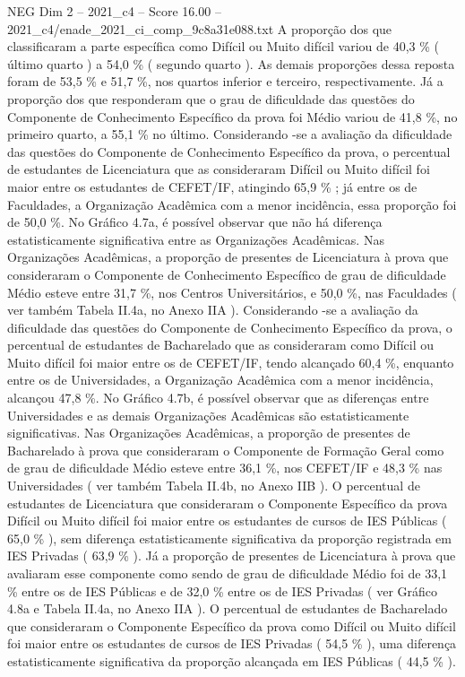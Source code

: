 \begin{textsample}{NEG Dim 2 – 2021\_c4 – Score 16.00 – 2021\_c4/enade\_2021\_ci\_comp\_9c8a31e088.txt}
A proporção dos que classificaram a parte específica como Difícil ou Muito difícil variou de 40,3 \% ( último quarto ) a 54,0 \% ( segundo quarto ).
As demais proporções dessa reposta foram de 53,5 \% e 51,7 \%, nos quartos inferior e terceiro, respectivamente.
Já a proporção dos que responderam que o grau de dificuldade das questões do Componente de Conhecimento Específico da prova foi Médio variou de 41,8 \%, no primeiro quarto, a 55,1 \% no último.
Considerando -se a avaliação da dificuldade das questões do Componente de Conhecimento Específico da prova, o percentual de estudantes de Licenciatura que as consideraram Difícil ou Muito difícil foi maior entre os estudantes de CEFET/IF, atingindo 65,9 \% ; já entre os de Faculdades, a Organização Acadêmica com a menor incidência, essa proporção foi de 50,0 \%.
No Gráfico 4.7a, é possível observar que não há diferença estatisticamente significativa entre as Organizações Acadêmicas.
Nas Organizações Acadêmicas, a proporção de presentes de Licenciatura à prova que consideraram o Componente de Conhecimento Específico de grau de dificuldade Médio esteve entre 31,7 \%, nos Centros Universitários, e 50,0 \%, nas Faculdades ( ver também Tabela II.4a, no Anexo IIA ).
Considerando -se a avaliação da dificuldade das questões do Componente de Conhecimento Específico da prova, o percentual de estudantes de Bacharelado que as consideraram como Difícil ou Muito difícil foi maior entre os de CEFET/IF, tendo alcançado 60,4 \%, enquanto entre os de Universidades, a Organização Acadêmica com a menor incidência, alcançou 47,8 \%.
No Gráfico 4.7b, é possível observar que as diferenças entre Universidades e as demais Organizações Acadêmicas são estatisticamente significativas.
Nas Organizações Acadêmicas, a proporção de presentes de Bacharelado à prova que consideraram o Componente de Formação Geral como de grau de dificuldade Médio esteve entre 36,1 \%, nos CEFET/IF e 48,3 \% nas Universidades ( ver também Tabela II.4b, no Anexo IIB ).
O percentual de estudantes de Licenciatura que consideraram o Componente Específico da prova Difícil ou Muito difícil foi maior entre os estudantes de cursos de IES Públicas ( 65,0 \% ), sem diferença estatisticamente significativa da proporção registrada em IES Privadas ( 63,9 \% ).
Já a proporção de presentes de Licenciatura à prova que avaliaram esse componente como sendo de grau de dificuldade Médio foi de 33,1 \% entre os de IES Públicas e de 32,0 \% entre os de IES Privadas ( ver Gráfico 4.8a e Tabela II.4a, no Anexo IIA ).
O percentual de estudantes de Bacharelado que consideraram o Componente Específico da prova como Difícil ou Muito difícil foi maior entre os estudantes de cursos de IES Privadas ( 54,5 \% ), uma diferença estatisticamente significativa da proporção alcançada em IES Públicas ( 44,5 \% ).

\end{textsample}
